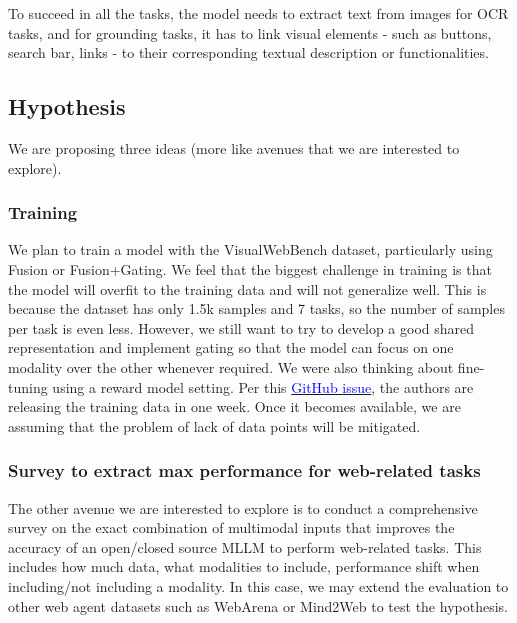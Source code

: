 \documentclass[11pt,a4paper]{article}
\begin{document}
To succeed in all the tasks, the model needs to extract text from images for OCR tasks, and for grounding tasks, it has to link visual elements - such as buttons, search bar, links - to their corresponding textual description or functionalities.


\subsection{Hypothesis}

We are proposing three ideas (more like avenues that we are interested to explore).

\subsubsection{Training}
We plan to train a model with the VisualWebBench dataset, particularly using Fusion or Fusion+Gating. We feel that the biggest challenge in training is that the model will overfit to the training data and will not generalize well. This is because the dataset has only 1.5k samples and 7 tasks, so the number of samples per task is even less. However, we still want to try to develop a good shared representation and implement gating so that the model can focus on one modality over the other whenever required. We were also thinking about fine-tuning using a reward model setting. Per this
\href{https://github.com/VisualWebBench/VisualWebBench/issues/6#:~:text=%40XinrunXu%20Thank%20you!%20It%20will%20be%20released%20in%20around%20two%20weeks!}{\textcolor{blue}{GitHub issue}}, the authors are releasing the training data in one week. Once it becomes available, we are assuming that the problem of lack of data points will be mitigated.

\subsubsection{Survey to extract max performance for web-related tasks}

The other avenue we are interested to explore is to conduct a comprehensive survey on the exact combination of multimodal inputs that improves the accuracy of an open/closed source MLLM to perform web-related tasks. This includes how much data, what modalities to include, performance shift when including/not including a modality. In this case, we may extend the evaluation to other web agent datasets such as WebArena or Mind2Web to test the hypothesis.
\end{document}
